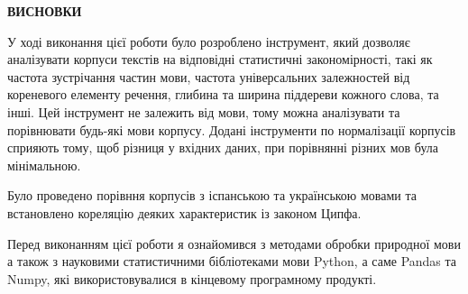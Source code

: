{}

\pagestyle{empty}

\begin{center}
\textbf{\Large ВИСНОВКИ}
\end{center}

У ході виконання цієї роботи було розроблено інструмент, який дозволяє аналізувати
корпуси текстів на відповідні статистичні закономірності, такі як частота зустрічання
частин мови, частота універсальних залежностей від кореневого елементу речення, глибина
та ширина піддереви кожного слова, та інші.
Цей інструмент не залежить від мови, тому можна аналізувати та порівнювати будь-які мови
корпусу. Додані інструменти по нормалізації корпусів сприяють тому, щоб різниця
у вхідних даних, при порівнянні різних мов була мінімальною.

Було проведено порівння корпусів з іспанською та українською мовами та встановлено кореляцію
деяких характеристик із законом Ципфа.

Перед виконанням цієї роботи я ознайомився з методами обробки природної мови
а також з науковими статистичними бібліотеками мови Python, а саме Pandas та Numpy, які використовувалися
в кінцевому програмному продукті.
